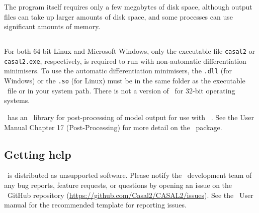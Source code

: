 The program itself requires only a few megabytes of disk space, although output files can take up larger amounts of disk space, and some processes can use significant amounts of memory.

\subsection{}

For both 64-bit Linux and Microsoft Windows, only the executable file \texttt{casal2} or \texttt{casal2.exe}, respectively, is required to run \CNAME with non-automatic differentiation minimisers. To use the automatic differentiation minimisers, the \texttt{.dll} (for Windows) or the \texttt{.so} (for Linux) must be in the same folder as the executable \CNAME\ file or in your system path. There is not a version of \CNAME\ for 32-bit operating systems. 

\CNAME\ has an \R\ library for post-processing of model output for use with \href{http://www.r-project.org}{\R}\ \citep{R}. See the \CNAME User Manual Chapter 17 (Post-Processing) for more detail on the \R\ package.

\subsection{Getting help}

\CNAME\ is distributed as unsupported software. Please notify the \CNAME\ development team of any bug reports, feature requests, or questions by opening an issue on the \CNAME\ GitHub repository (\url{https://github.com/Casal2/CASAL2/issues}). See the \CNAME\ User manual \citep{CASAL2} for the recommended template for reporting issues.

